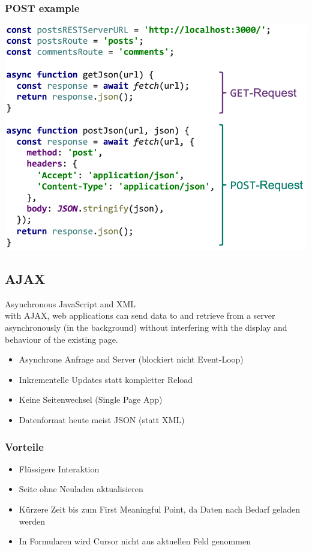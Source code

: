 \documentclass[a4paper, landscape, 8pt]{scrartcl}
\begin{document}
\begin{multicols*}{4}
        \subsubsection{POST example}
        \includegraphics[width=\columnwidth]{graphic/41-post-example}

        \subsection{AJAX}
        Asynchronous JavaScript and XML \\
        with AJAX, web applications can send data to and retrieve from a server asynchronously (in the background) without interfering with the display and behaviour of the existing page.

        \begin{itemize}
            \item Asynchrone Anfrage and Server (blockiert nicht Event-Loop)
            \item Inkrementelle Updates statt kompletter Reload
            \item Keine Seitenwechsel (Single Page App)
            \item Datenformat heute meist JSON (statt XML)
        \end{itemize}

        \subsubsection{Vorteile}
        \begin{itemize}
            \item Flüssigere Interaktion
            \item Seite ohne Neuladen aktualisieren
            \item Kürzere Zeit bis zum First Meaningful Point, da Daten nach Bedarf geladen werden
            \item In Formularen wird Cursor nicht aus aktuellen Feld genommen
        \end{itemize}


\end{multicols*}
\end{document}
